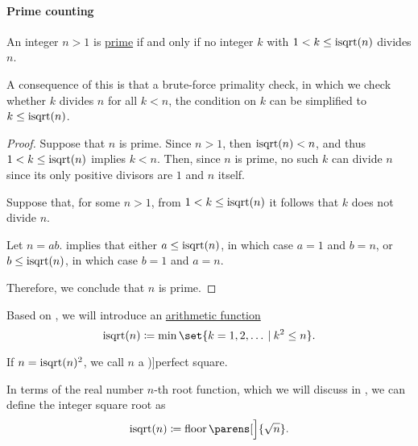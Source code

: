 \paragraph{Prime counting}

\begin{proposition}\label{thm:prime_number_sqrt}
  An integer \( n > 1 \) is \hyperref[def:prime_number]{prime} if and only if no integer \( k \) with \( 1 < k \leq \op{isqrt}(n) \) divides \( n \).
\end{proposition}
\begin{comments}
  \item A consequence of this is that a brute-force primality check, in which we check whether \( k \) divides \( n \) for all \( k < n \), the condition on \( k \) can be simplified to \( k \leq \op{isqrt}(n) \).
\end{comments}
\begin{proof}
  \SufficiencySubProof Suppose that \( n \) is prime. Since \( n > 1 \), then \( \op{isqrt}(n) < n \), and thus \( 1 < k \leq \op{isqrt}(n) \) implies \( k < n \). Then, since \( n \) is prime, no such \( k \) can divide \( n \) since its only positive divisors are \( 1 \) and \( n \) itself.

  \NecessitySubProof Suppose that, for some \( n > 1 \), from \( 1 < k \leq \op{isqrt}(n) \) it follows that \( k \) does not divide \( n \).

  Let \( n = ab \).  implies that either \( a \leq \op{isqrt}(n) \), in which case \( a = 1 \) and \( b = n \), or \( b \leq \op{isqrt}(n) \), in which case \( b = 1 \) and \( a = n \).

  Therefore, we conclude that \( n \) is prime.
\end{proof}

\begin{definition}\label{def:int_sqrt}\mimprovised
  Based on \cite{PythonDocs:3.13:math}, we will introduce an  \hyperref[def:arithmetic_function]{arithmetic function}
  \begin{equation*}
    \op{isqrt}(n) \coloneqq \min\set{ k = 1, 2, \ldots \given k^2 \leq n }.
  \end{equation*}

  If \( n = \op{isqrt}(n)^2 \), we call \( n \) a \term[en=perfect square (\cite[example 1.7.1]{Rosen2019DiscreteMathematics})]{perfect square}.
\end{definition}
\begin{comments}
  \item In terms of the real number \( n \)-th root function, which we will discuss in , we can define the integer square root as
  \begin{equation*}
    \op{isqrt}(n) \coloneqq \floor\parens[\Big]{ \sqrt{n} }.
  \end{equation*}
\end{comments}

